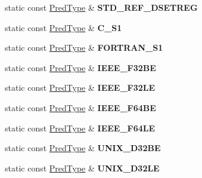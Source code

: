 \begin{DoxyCompactItemize}
static const \hyperlink{class_h5_1_1_pred_type}{Pred\+Type} \& {\bfseries S\+T\+D\+\_\+\+R\+E\+F\+\_\+\+D\+S\+E\+T\+R\+EG}
\item 
\mbox{\label{class_h5_1_1_pred_type_a74082a7ba9fa5dfef3547412b0833488}} 
static const \hyperlink{class_h5_1_1_pred_type}{Pred\+Type} \& {\bfseries C\+\_\+\+S1}
\item 
\mbox{\label{class_h5_1_1_pred_type_aa5783f4525d5b752c62bdb660e8a24e6}} 
static const \hyperlink{class_h5_1_1_pred_type}{Pred\+Type} \& {\bfseries F\+O\+R\+T\+R\+A\+N\+\_\+\+S1}
\item 
\mbox{\label{class_h5_1_1_pred_type_acaeab7b2738a495d10a77770bdede32a}} 
static const \hyperlink{class_h5_1_1_pred_type}{Pred\+Type} \& {\bfseries I\+E\+E\+E\+\_\+\+F32\+BE}
\item 
\mbox{\label{class_h5_1_1_pred_type_a97b527d5e26f2c228dde84114cd0bfae}} 
static const \hyperlink{class_h5_1_1_pred_type}{Pred\+Type} \& {\bfseries I\+E\+E\+E\+\_\+\+F32\+LE}
\item 
\mbox{\label{class_h5_1_1_pred_type_a80503b80765160d973d1f79175532849}} 
static const \hyperlink{class_h5_1_1_pred_type}{Pred\+Type} \& {\bfseries I\+E\+E\+E\+\_\+\+F64\+BE}
\item 
\mbox{\label{class_h5_1_1_pred_type_a80adbf282fc813480e81f9e61054b904}} 
static const \hyperlink{class_h5_1_1_pred_type}{Pred\+Type} \& {\bfseries I\+E\+E\+E\+\_\+\+F64\+LE}
\item 
\mbox{\label{class_h5_1_1_pred_type_a99d93797f169ee1ec2b2fcfe12a193ed}} 
static const \hyperlink{class_h5_1_1_pred_type}{Pred\+Type} \& {\bfseries U\+N\+I\+X\+\_\+\+D32\+BE}
\item 
\mbox{\label{class_h5_1_1_pred_type_a6fb94b259326d8a267a0acdb5630b7fe}} 
static const \hyperlink{class_h5_1_1_pred_type}{Pred\+Type} \& {\bfseries U\+N\+I\+X\+\_\+\+D32\+LE}
\item 
\mbox{\label{class_h5_1_1_pred_type_a0de852cf3e1f735ce2c9a6f2eb712572}} 

\end{DoxyCompactItemize}
